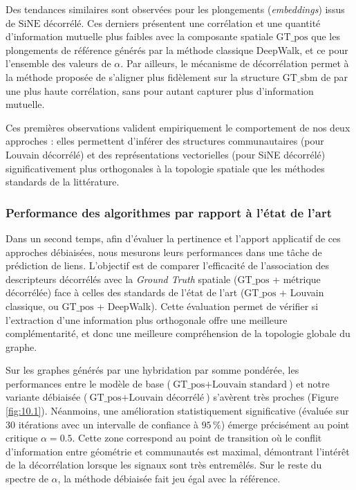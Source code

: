 Des tendances similaires sont observées pour les plongements (\textit{embeddings}) issus de $\text{SiNE}$ décorrélé. Ces derniers présentent une corrélation et une quantité d'information mutuelle plus faibles avec la composante spatiale $\text{GT\_pos}$ que les plongements de référence générés par la méthode classique DeepWalk, et ce pour l'ensemble des valeurs de $\alpha$. Par ailleurs, le mécanisme de décorrélation permet à la méthode proposée de s'aligner plus fidèlement sur la structure $\text{GT\_sbm}$ de par une plus haute corrélation, sans pour autant capturer plus d'information mutuelle.

Ces premières observations valident empiriquement le comportement de nos deux approches : elles permettent d'inférer des structures communautaires (pour Louvain décorrélé) et des représentations vectorielles (pour SiNE décorrélé) significativement plus orthogonales à la topologie spatiale que les méthodes standards de la littérature.

\subsubsection{Performance des algorithmes par rapport à l'état de l'art}

Dans un second temps, afin d'évaluer la pertinence et l'apport applicatif de ces approches débiaisées, nous mesurons leurs performances dans une tâche de prédiction de liens. L'objectif est de comparer l'efficacité de l'association des descripteurs décorrélés avec la \textit{Ground Truth} spatiale ($\text{GT\_pos}$ + métrique décorrélée) face à celles des standards de l'état de l'art ($\text{GT\_pos}$ + Louvain classique, ou $\text{GT\_pos}$ + DeepWalk). Cette évaluation permet de vérifier si l'extraction d'une information plus orthogonale offre une meilleure complémentarité, et donc une meilleure compréhension de la topologie globale du graphe.

Sur les graphes générés par une hybridation par somme pondérée, les performances entre le modèle de base ($\text{GT\_pos} + \text{Louvain standard}$) et notre variante débiaisée ($\text{GT\_pos} + \text{Louvain décorrélé}$) s'avèrent très proches (Figure \ref{fig:10.1}). Néanmoins, une amélioration statistiquement significative (évaluée sur 30 itérations avec un intervalle de confiance à $95\,\%$) émerge précisément au point critique $\alpha = 0.5$. Cette zone correspond au point de transition où le conflit d'information entre géométrie et communautés est maximal, démontrant l'intérêt de la décorrélation lorsque les signaux sont très entremêlés. Sur le reste du spectre de $\alpha$, la méthode débiaisée fait jeu égal avec la référence.

